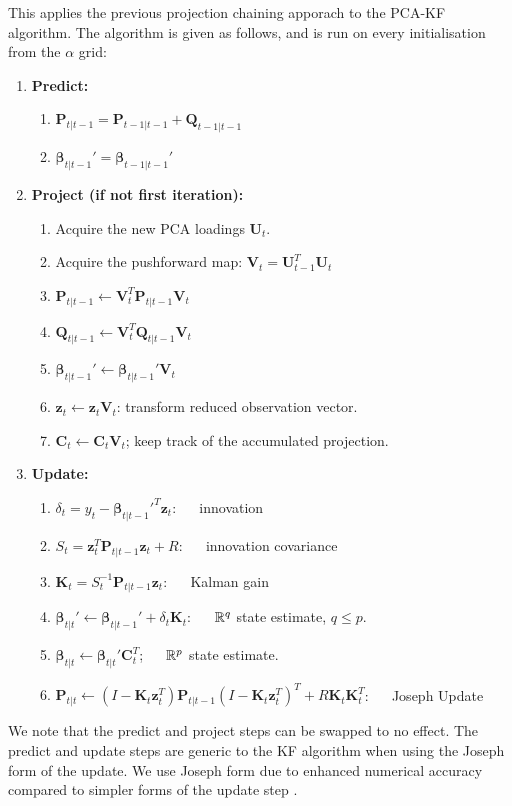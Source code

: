 This applies the previous projection chaining apporach to the PCA-KF algorithm. The algorithm is given as follows, and is run on every initialisation from the $\alpha$ grid:
\begin{enumerate}
    \item \textbf{Predict:}
    \begin{enumerate}
        \item $\bm{P}_{t|t-1} = \bm{P}_{t-1|t-1}+\bm{Q}_{t-1|t-1}$
        \item $\bm{\beta}_{t|t-1}' = \bm{\beta}_{t-1|t-1}'$
    \end{enumerate}
    \item \textbf{Project (if not first iteration):}
    \begin{enumerate}
        \item Acquire the new PCA loadings $\bm{U}_t$.
        \item Acquire the pushforward map: $\bm{V}_t=\bm{U}_{t-1}^T\bm{U}_t$
        \item $\bm{P}_{t|t-1}\leftarrow \bm{V}_t^T\bm{P}_{t|t-1}\bm{V}_t$
        \item $\bm{Q}_{t|t-1}\leftarrow \bm{V}_t^T\bm{Q}_{t|t-1}\bm{V}_t$
        \item $\bm{\beta}_{t|t-1}' \leftarrow \bm{\beta}_{t|t-1}'\bm{V}_t$
        \item $\bm{z}_t\leftarrow \bm{z}_{t}\bm{V}_t$: transform reduced observation vector.
        \item $\bm{C}_t \leftarrow \bm{C}_t \bm{V}_t$; keep track of the accumulated projection.
    \end{enumerate}
    \item \textbf{Update:}
    \begin{enumerate}
        \item $\delta_t=y_t-\bm{\beta}_{t|t-1}'^T\bm{z}_t$: $\quad$ innovation
        \item $S_t= \bm{z}_t^T \bm{P}_{t|t-1}\bm{z}_t + R$: $\quad$ innovation covariance
        \item $\bm{K}_t = S_t^{-1}\bm{P}_{t|t-1}\bm{z}_t$: $\quad$ Kalman gain
        \item $\bm{\beta}_{t|t}' \leftarrow \bm{\beta}_{t|t-1}' + \delta_t\bm{K}_t$: $\quad$ $\mathbb{R}^q$ state estimate, $q\le p$.
        \item $\bm{\beta}_{t|t} \leftarrow \bm{\beta}_{t|t}' \bm{C}_t^T$;  $\quad$ $\mathbb{R}^p$ state estimate.
        \item $\bm{P}_{t|t} \leftarrow (I-\bm{K}_t \bm{z}_t^T)\bm{P}_{t|t-1}(I-\bm{K}_t \bm{z}_t^T)^T+R\bm{K}_t\bm{K}_t^T$: $\quad$ Joseph Update
    \end{enumerate}
\end{enumerate} 
We note that the predict and project steps can be swapped to no effect. The predict and update steps are generic to the KF algorithm when using the Joseph form of the update. We use Joseph form due to enhanced numerical accuracy compared to simpler forms of the update step \cite{Zanetti_DeMars_2013}. 

